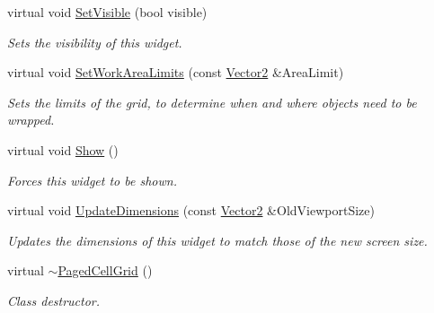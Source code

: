 \begin{DoxyCompactItemize}
virtual void \hyperlink{classphys_1_1UI_1_1PagedCellGrid_a76ff4b649f4687203ba9d1473474ce99}{SetVisible} (bool visible)
\begin{DoxyCompactList}\small\item\em Sets the visibility of this widget. \item\end{DoxyCompactList}\item 
virtual void \hyperlink{classphys_1_1UI_1_1PagedCellGrid_af50d0b6337d727ac914f1f0c6f15c198}{SetWorkAreaLimits} (const \hyperlink{classphys_1_1Vector2}{Vector2} \&AreaLimit)
\begin{DoxyCompactList}\small\item\em Sets the limits of the grid, to determine when and where objects need to be wrapped. \item\end{DoxyCompactList}\item 
\hypertarget{classphys_1_1UI_1_1PagedCellGrid_aae7ae6fbe4d0fc1006c6abd8d1f22727}{
virtual void \hyperlink{classphys_1_1UI_1_1PagedCellGrid_aae7ae6fbe4d0fc1006c6abd8d1f22727}{Show} ()}
\label{classphys_1_1UI_1_1PagedCellGrid_aae7ae6fbe4d0fc1006c6abd8d1f22727}

\begin{DoxyCompactList}\small\item\em Forces this widget to be shown. \item\end{DoxyCompactList}\item 
virtual void \hyperlink{classphys_1_1UI_1_1PagedCellGrid_a7d6ddd7126f86d2ea6592ac3f9a91037}{UpdateDimensions} (const \hyperlink{classphys_1_1Vector2}{Vector2} \&OldViewportSize)
\begin{DoxyCompactList}\small\item\em Updates the dimensions of this widget to match those of the new screen size. \item\end{DoxyCompactList}\item 
\hypertarget{classphys_1_1UI_1_1PagedCellGrid_a6b9c8876b41321b77321efcf27feb2c6}{
virtual \hyperlink{classphys_1_1UI_1_1PagedCellGrid_a6b9c8876b41321b77321efcf27feb2c6}{$\sim$PagedCellGrid} ()}
\label{classphys_1_1UI_1_1PagedCellGrid_a6b9c8876b41321b77321efcf27feb2c6}

\begin{DoxyCompactList}\small\item\em Class destructor. \item\end{DoxyCompactList}\end{DoxyCompactItemize}
